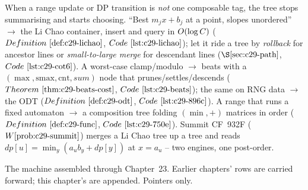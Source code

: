 \begin{recallbox}
When a range update or DP transition is \emph{not} one composable tag, the tree stops summarising and
starts choosing. ``Best \(m_jx+b_j\) at a point, slopes unordered'' \(\to\) the Li Chao container,
insert and query in \(O(\log C)\) (\(\defref{c29-lichao}\), \(\coderef{c29-lichao}\)); let it ride a
tree by \emph{rollback} for ancestor lines or \emph{small-to-large merge} for descendant lines
(\(\secref{c29-path}\), \(\coderef{c29-cot6}\)). A worst-case clamp/modulo \(\to\) beats with a
\((\max,\mathrm{smax},\mathrm{cnt},\mathit{sum})\) node that prunes/settles/descends
(\(\thmref{c29-beats-cost}\), \(\coderef{c29-beats}\)); the same on RNG data \(\to\) the ODT
(\(\defref{c29-odt}\), \(\coderef{c29-896c}\)). A range that runs a fixed automaton \(\to\) a
composition tree folding \((\min,+)\) matrices in order (\(\defref{c29-func}\), \(\coderef{c29-750e}\)).
Summit CF~932F (\(\probref{c29-summit}\)) merges a Li Chao tree up a tree and reads
\(\mathit{dp}[u]=\min_y(a_u b_y+\mathit{dp}[y])\) at \(x=a_u\) -- two engines, one post-order.
\end{recallbox}



The machine assembled through Chapter~23. Earlier chapters' rows are carried forward; this chapter's
are appended. Pointers only.

